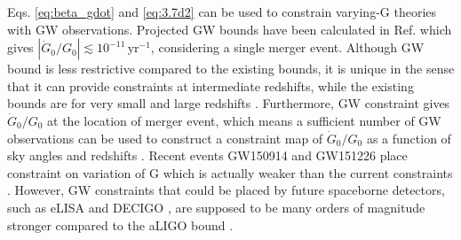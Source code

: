 \documentclass[prd,twocolumn,nofootinbib]{revtex4-1}
\begin{document}
Eqs. \eqref{eq:beta_gdot} and \eqref{eq:3.7d2} can be used to constrain varying-G theories with GW observations. Projected GW bounds have been calculated in Ref. \cite{Yunes:2009bv} which gives $|\dot{G}_0/G_0| \lesssim 10^{-11}\, \mathrm{yr}^{-1}$, considering a single merger event. Although GW bound is less restrictive compared to the existing bounds, it is unique in the sense that it can provide constraints at intermediate redshifts, while the existing bounds are for very small and large redshifts \cite{Yunes:2009bv}. Furthermore, GW constraint gives $\dot{G}_0/G_0$ at the location of merger event, which means a sufficient number of GW observations can be used to construct a constraint map of $\dot{G}_0/G_0$ as a function of sky angles and redshifts \cite{Yunes:2009bv}. Recent events GW150914 and GW151226 place constraint on variation of G which is actually weaker than the current constraints \cite{Yunes:2016jcc}. However, GW constraints that could be placed by future spaceborne detectors, such as eLISA \cite{Seoane:2013qna} and DECIGO \cite{PhysRevLett.87.221103}, are supposed to be many orders of magnitude stronger compared to the aLIGO bound \cite{Yunes:2009bv}.
 



\end{document}
